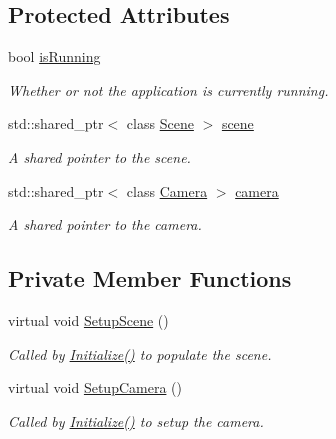 \subsection*{Protected Attributes}
\begin{DoxyCompactItemize}
\item 
bool \hyperlink{class_application_ae1c1ff7a7663d9baa9b65a7ba8e1dcf8}{is\+Running}
\begin{DoxyCompactList}\small\item\em Whether or not the application is currently running. \end{DoxyCompactList}\item 
std\+::shared\+\_\+ptr$<$ class \hyperlink{class_scene}{Scene} $>$ \hyperlink{class_application_a88c6615107a5094bb93fa5f153f79554}{scene}
\begin{DoxyCompactList}\small\item\em A shared pointer to the scene. \end{DoxyCompactList}\item 
std\+::shared\+\_\+ptr$<$ class \hyperlink{class_camera}{Camera} $>$ \hyperlink{class_application_a0e8589fcb13c520ba472473abe5a518d}{camera}
\begin{DoxyCompactList}\small\item\em A shared pointer to the camera. \end{DoxyCompactList}\end{DoxyCompactItemize}
\subsection*{Private Member Functions}
\begin{DoxyCompactItemize}
\item 
virtual void \hyperlink{class_application_aa8e8017ef8dd86293c96d0645e66d440}{Setup\+Scene} ()
\begin{DoxyCompactList}\small\item\em Called by \hyperlink{class_application_a17cf1ea4552d26a1c20f7d98d793d41d}{Initialize()} to populate the scene. \end{DoxyCompactList}\item 
virtual void \hyperlink{class_application_a2eb61ca027f223a5c5ad1bf982481193}{Setup\+Camera} ()
\begin{DoxyCompactList}\small\item\em Called by \hyperlink{class_application_a17cf1ea4552d26a1c20f7d98d793d41d}{Initialize()} to setup the camera. \end{DoxyCompactList}\end{DoxyCompactItemize}


